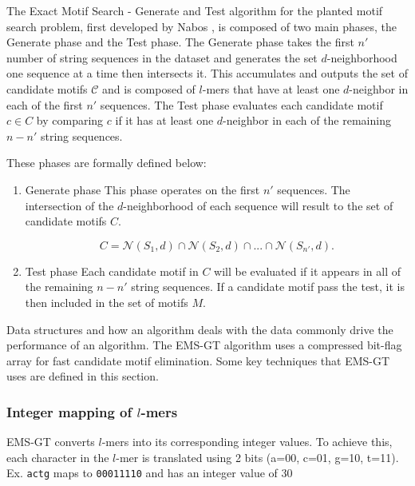 
The Exact Motif Search - Generate and Test algorithm for the planted motif search problem, first developed by Nabos \cite{nabos2015dissertation}, is composed of two main phases, the Generate phase and the Test phase. The Generate phase takes the first $n'$ number of string sequences in the dataset and generates the set $d$-neighborhood one sequence at a time then intersects it. This accumulates and outputs the set of candidate motifs $\mathcal{C}$ and is composed of $l$-mers that have at least one $d$-neighbor in each of the first $n'$ sequences. The Test phase evaluates each candidate motif $c \in C$ by comparing $c$ if it has at least one $d$-neighbor in each of the remaining $n - n'$ string sequences. \newline

\noindent These phases are formally defined below:
\begin{enumerate} [label={\em (\alph*)}]

	\item {Generate phase} \newline
	This phase operates on the first $n'$ sequences. The intersection of the $d$-neighborhood of each sequence will result to the set of candidate motifs $C$.

	\begin{equation}
		C = \mathcal{N}(S_{1}, d) \cap \mathcal{N}(S_{2}, d) \cap...\cap \mathcal{N}(S_{n'}, d).
	\end{equation} \newline

	\item {Test phase}\newline
	Each candidate motif in $C$ will be evaluated if it appears in all of the remaining $n - n'$ string sequences. If a candidate motif pass the test, it is then included in the set of motifs $M$. 

\end{enumerate}

% 

% 

Data structures and how an algorithm deals with the data commonly drive the performance of an algorithm. The EMS-GT algorithm uses a compressed bit-flag array for fast candidate motif elimination. Some key techniques that EMS-GT uses are defined in this section.

	\subsubsection{Integer mapping of $l$-mers}
	EMS-GT converts $l$-mers into its corresponding integer values. To achieve this, each character in the $l$-mer is translated using 2 bits (a=00, c=01, g=10, t=11). \newline
		{\small Ex.	\texttt{actg} maps to \texttt{00011110} and has an integer value of 30} 

